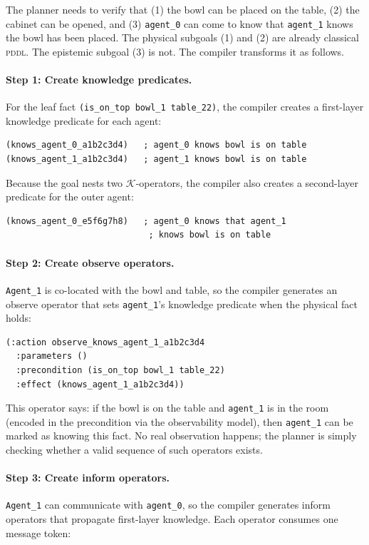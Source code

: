 \documentclass{article} %
\newcommand{\K}{\mathcal{K}}
\newcommand{\pddl}{\textsc{pddl}}
\begin{document}
The planner needs to verify that (1) the bowl can be placed on the table, (2) the cabinet can be opened, and (3) \texttt{agent\_0} can come to know that \texttt{agent\_1} knows the bowl has been placed. The physical subgoals (1) and (2) are already classical \pddl{}. The epistemic subgoal (3) is not. The compiler transforms it as follows.

\paragraph{Step 1: Create knowledge predicates.} For the leaf fact \texttt{(is\_on\_top bowl\_1 table\_22)}, the compiler creates a first-layer knowledge predicate for each agent:

\begin{lstlisting}
(knows_agent_0_a1b2c3d4)   ; agent_0 knows bowl is on table
(knows_agent_1_a1b2c3d4)   ; agent_1 knows bowl is on table
\end{lstlisting}

Because the goal nests two $\K$-operators, the compiler also creates a second-layer predicate for the outer agent:

\begin{lstlisting}
(knows_agent_0_e5f6g7h8)   ; agent_0 knows that agent_1
                            ; knows bowl is on table
\end{lstlisting}

\paragraph{Step 2: Create observe operators.} \texttt{Agent\_1} is co-located with the bowl and table, so the compiler generates an observe operator that sets \texttt{agent\_1}'s knowledge predicate when the physical fact holds:

\begin{lstlisting}
(:action observe_knows_agent_1_a1b2c3d4
  :parameters ()
  :precondition (is_on_top bowl_1 table_22)
  :effect (knows_agent_1_a1b2c3d4))
\end{lstlisting}

This operator says: if the bowl is on the table and \texttt{agent\_1} is in the room (encoded in the precondition via the observability model), then \texttt{agent\_1} can be marked as knowing this fact. No real observation happens; the planner is simply checking whether a valid sequence of such operators exists.

\paragraph{Step 3: Create inform operators.} \texttt{Agent\_1} can communicate with \texttt{agent\_0}, so the compiler generates inform operators that propagate first-layer knowledge. Each operator consumes one message token:
\end{document}
